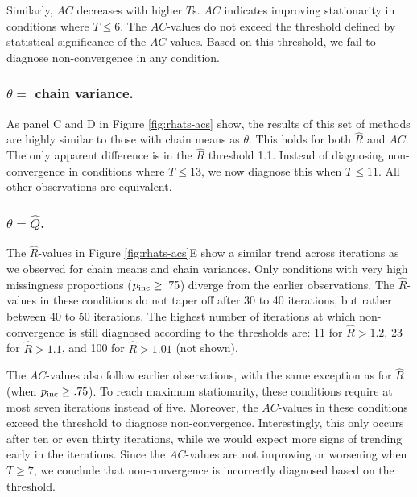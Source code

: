 \documentclass[Royal,times,sageh]{sagej}
\begin{document}
Similarly, \(AC\) decreases with higher \(T\)s. \(AC\) indicates improving stationarity in conditions where \(T\leq6\). The \(AC\)-values do not exceed the threshold defined by statistical significance of the \(AC\)-values. Based on this threshold, we fail to diagnose non-convergence in any condition.

\hypertarget{theta-chain-variance.}{%
\subsubsection{\texorpdfstring{\(\theta=\) chain variance.}{\textbackslash theta= chain variance.}}\label{theta-chain-variance.}}

As panel C and D in Figure \ref{fig:rhats-acs} show, the results of this set of methods are highly similar to those with chain means as \(\theta\). This holds for both \(\widehat{R}\) and \(AC\). The only apparent difference is in the \(\widehat{R}\) threshold 1.1. Instead of diagnosing non-convergence in conditions where \(T\leq13\), we now diagnose this when \(T\leq11\). All other observations are equivalent.

\hypertarget{thetahatq.}{%
\subsubsection{\texorpdfstring{\(\theta=\hat{Q}\).}{\textbackslash theta=\textbackslash hat\{Q\}.}}\label{thetahatq.}}

The \(\widehat{R}\)-values in Figure \ref{fig:rhats-acs}E show a similar trend across iterations as we observed for chain means and chain variances. Only conditions with very high missingness proportions (\(p_{\rm inc}\geq.75\)) diverge from the earlier observations. The \(\widehat{R}\)-values in these conditions do not taper off after 30 to 40 iterations, but rather between 40 to 50 iterations. The highest number of iterations at which non-convergence is still diagnosed according to the thresholds are: 11 for \(\widehat{R}>1.2\), 23 for \(\widehat{R}>1.1\), and 100 for \(\widehat{R}>1.01\) (not shown).

The \(AC\)-values also follow earlier observations, with the same exception as for \(\widehat{R}\) (when \(p_{\rm inc}\geq.75\)). To reach maximum stationarity, these conditions require at most seven iterations instead of five. Moreover, the \(AC\)-values in these conditions exceed the threshold to diagnose non-convergence. Interestingly, this only occurs after ten or even thirty iterations, while we would expect more signs of trending early in the iterations. Since the \(AC\)-values are not improving or worsening when \(T\geq7\), we conclude that non-convergence is incorrectly diagnosed based on the threshold.
\end{document}
